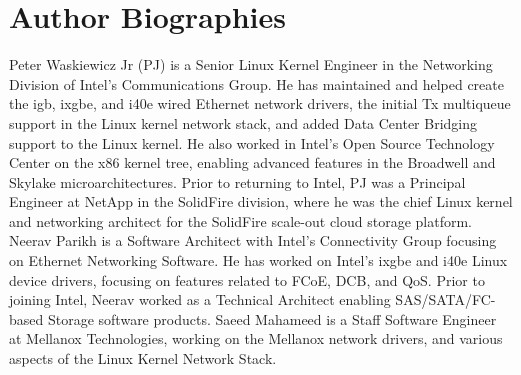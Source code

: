 \documentclass[letterpaper]{article}
\begin{document}
\section{Author Biographies}
Peter Waskiewicz Jr (PJ) is a Senior Linux Kernel Engineer in the Networking Division of Intel's Communications Group. He has maintained and helped create the igb, ixgbe, and i40e wired Ethernet network drivers, the initial Tx multiqueue support in the Linux kernel network stack, and added Data Center Bridging support to the Linux kernel. He also worked in Intel's Open Source Technology Center on the x86 kernel tree, enabling advanced features in the Broadwell and Skylake microarchitectures. Prior to returning to Intel, PJ was a Principal Engineer at NetApp in the SolidFire division, where he was the chief Linux kernel and networking architect for the SolidFire scale-out cloud storage platform.
\newline
\newline
Neerav Parikh is a Software Architect with Intel's Connectivity Group focusing on Ethernet Networking Software. He has worked on Intel's ixgbe and i40e Linux device drivers, focusing on features related to FCoE, DCB, and QoS. Prior to joining Intel, Neerav worked as a Technical Architect enabling SAS/SATA/FC-based Storage software products.
\newline
\newline
Saeed Mahameed is a Staff Software Engineer at Mellanox Technologies, working on the Mellanox network drivers, and various aspects of the Linux Kernel Network Stack.
\end{document}
